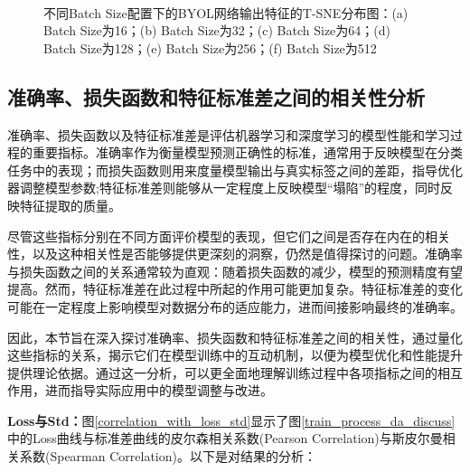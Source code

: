 \documentclass[master]{thesis-uestc}
\begin{document}
\begin{figure}[h]
    \centering
    \\
    
    \caption{不同Batch Size配置下的BYOL网络输出特征的T-SNE分布图：(a) Batch Size为16；(b) Batch Size为32；(c) Batch Size为64；(d) Batch Size为128；(e) Batch Size为256；(f) Batch Size为512}
    \label{tsne_byol_diff_batch_size}
\end{figure}
\FloatBarrier  %
\subsection{准确率、损失函数和特征标准差之间的相关性分析}

准确率、损失函数以及特征标准差是评估机器学习和深度学习的模型性能和学习过程的重要指标。准确率作为衡量模型预测正确性的标准，通常用于反映模型在分类任务中的表现；而损失函数则用来度量模型输出与真实标签之间的差距，指导优化器调整模型参数;特征标准差则能够从一定程度上反映模型“塌陷”的程度，同时反映特征提取的质量。

尽管这些指标分别在不同方面评价模型的表现，但它们之间是否存在内在的相关性，以及这种相关性是否能够提供更深刻的洞察，仍然是值得探讨的问题。准确率与损失函数之间的关系通常较为直观：随着损失函数的减少，模型的预测精度有望提高。然而，特征标准差在此过程中所起的作用可能更加复杂。特征标准差的变化可能在一定程度上影响模型对数据分布的适应能力，进而间接影响最终的准确率。

因此，本节旨在深入探讨准确率、损失函数和特征标准差之间的相关性，通过量化这些指标的关系，揭示它们在模型训练中的互动机制，以便为模型优化和性能提升提供理论依据。通过这一分析，可以更全面地理解训练过程中各项指标之间的相互作用，进而指导实际应用中的模型调整与改进。

\textbf{Loss与Std：}图\ref{correlation_with_loss_std}显示了图\ref{train_process_da_discuss}中的Loss曲线与标准差曲线的皮尔森相关系数(Pearson Correlation)与斯皮尔曼相关系数(Spearman Correlation)。以下是对结果的分析：
\end{document}
